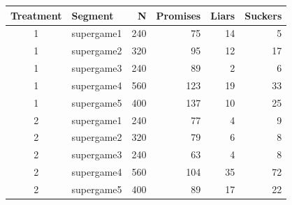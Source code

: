 \begin{tabular}{clrrrr}
  \toprule
Treatment & Segment & N & Promises & Liars & Suckers \\ 
  \midrule
  1 & supergame1 & 240 &  75 &  14 &   5 \\ 
    1 & supergame2 & 320 &  95 &  12 &  17 \\ 
    1 & supergame3 & 240 &  89 &   2 &   6 \\ 
    1 & supergame4 & 560 & 123 &  19 &  33 \\ 
    1 & supergame5 & 400 & 137 &  10 &  25 \\ 
    2 & supergame1 & 240 &  77 &   4 &   9 \\ 
    2 & supergame2 & 320 &  79 &   6 &   8 \\ 
    2 & supergame3 & 240 &  63 &   4 &   8 \\ 
    2 & supergame4 & 560 & 104 &  35 &  72 \\ 
    2 & supergame5 & 400 &  89 &  17 &  22 \\ 
   \bottomrule
\end{tabular}
